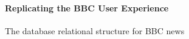 \documentclass[10pt]{article}
\begin{document}
\begin{figure}[htbp]
    \centering
    \begin{minipage}[t]{0.4\textwidth}
        \caption{The database relational structure for BBC news}
        \label{fig:bbc structure}
    \end{minipage}
    \hfill
    \begin{minipage}[t]{0.5\textwidth}
        \paragraph{Replicating the BBC User Experience}


\end{minipage}
\end{figure}
\end{document}
